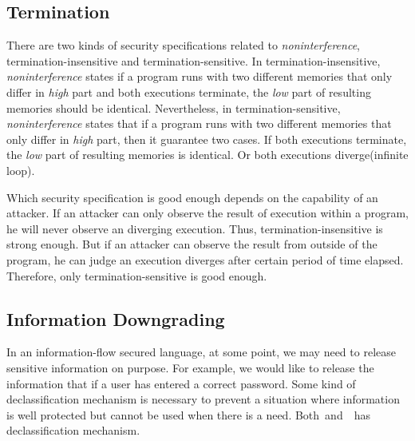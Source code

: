 \subsection{Termination}
There are two kinds of security specifications related to
{\it noninterference}, termination-insensitive and
termination-sensitive. In termination-insensitive,
{\it noninterference} states if a program runs with two
different memories that only differ in {\it high} 
part and both executions terminate, the {\it low} part
of resulting memories should be identical. Nevertheless, in
termination-sensitive, {\it noninterference} states that
if a program runs with two different memories that
only differ in {\it high} part, then it guarantee
two cases. If both executions terminate, the {\it low} part
of resulting memories is identical. Or both executions 
diverge(infinite loop).

Which security specification is good enough depends on
the capability of an attacker. If an attacker can only
observe the result of execution within a program, 
he will never observe an diverging execution. Thus,
termination-insensitive is strong enough. But if an
attacker can observe the result from outside of the
program, he can judge an execution diverges after
certain period of time elapsed. Therefore, only
termination-sensitive is good enough.

\subsection{Information Downgrading}
In an information-flow secured language, at some point, 
we may need to release sensitive information on purpose.
For example, we would like to release the information that if a user
has entered a correct password. Some kind of declassification
mechanism is necessary to prevent a situation where information
is well protected but cannot be used when there is a need. 
Both~\cite{jif}and~\cite{Li:Zdancewic:CSFW}~has declassification 
mechanism.
